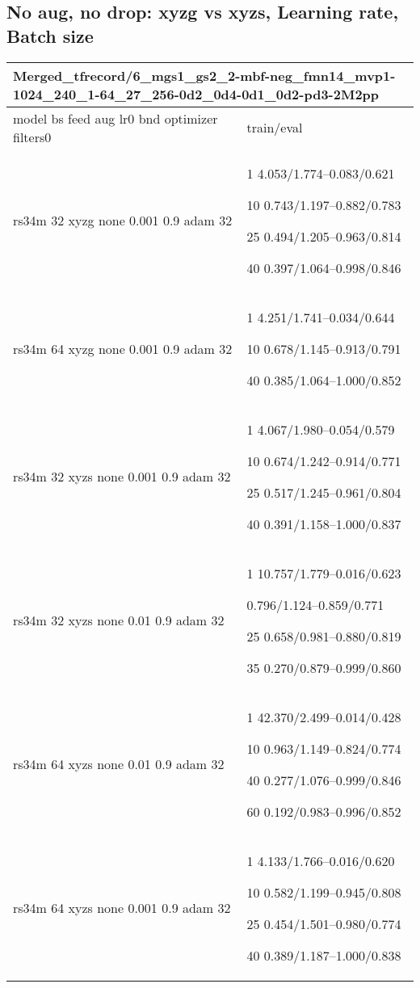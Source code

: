\documentclass[,table,dvipsnames]{article}
\begin{document}
\subsection{No aug, no drop: xyzg vs xyzs, Learning rate, Batch size}
\noindent\begin{tabular}{|p{9cm}|p{6cm}| }	
	\hline
	\multicolumn{2}{|p{15cm}|}{Merged\_tfrecord/6\_mgs1\_gs2\_2-mbf-neg\_fmn14\_mvp1-1024\_240\_1-64\_27\_256-0d2\_0d4-0d1\_0d2-pd3-2M2pp}\\
	\hline
	model bs feed aug lr0 bnd optimizer filters0 & train/eval \\
	
	\rowcolor{blue!20}
	rs34m 32 xyzg none 0.001 0.9 adam 32& 1 4.053/1.774--0.083/0.621\par 10 0.743/1.197--0.882/0.783\par 25 0.494/1.205--0.963/0.814\par 40 0.397/1.064--0.998/0.846\\
	
	\rowcolor{yellow!20}	
	rs34m 64 xyzg none 0.001 0.9 adam 32& 1 4.251/1.741--0.034/0.644\par 10 0.678/1.145--0.913/0.791\par 40 0.385/1.064--1.000/0.852\\
	
	
	\hline\hline
	\rowcolor{green!20}
	\hline
	rs34m 32 xyzs none 0.001 0.9 adam 32 & 1 4.067/1.980--0.054/0.579\par 10 0.674/1.242--0.914/0.771\par 25 0.517/1.245--0.961/0.804\par 40 0.391/1.158--1.000/0.837\\
	
	
	\rowcolor{blue!20} 
	rs34m 32 xyzs none 0.01 0.9 adam 32& 1 10.757/1.779--0.016/0.623\par 0.796/1.124--0.859/0.771\par 25 0.658/0.981--0.880/0.819\par 35 0.270/0.879--0.999/0.860\\
	
	\rowcolor{Orange!20}
	rs34m 64 xyzs none 0.01 0.9 adam 32& 1 42.370/2.499--0.014/0.428\par 10 0.963/1.149--0.824/0.774\par 40 0.277/1.076--0.999/0.846\par 60 0.192/0.983--0.996/0.852\\
	
	\rowcolor{red!20}
	rs34m 64 xyzs none 0.001 0.9 adam 32& 1 4.133/1.766--0.016/0.620\par 10 0.582/1.199--0.945/0.808\par 25 0.454/1.501--0.980/0.774\par  40 0.389/1.187--1.000/0.838\\
	
	\hline
	
\end{tabular}
\end{document}
